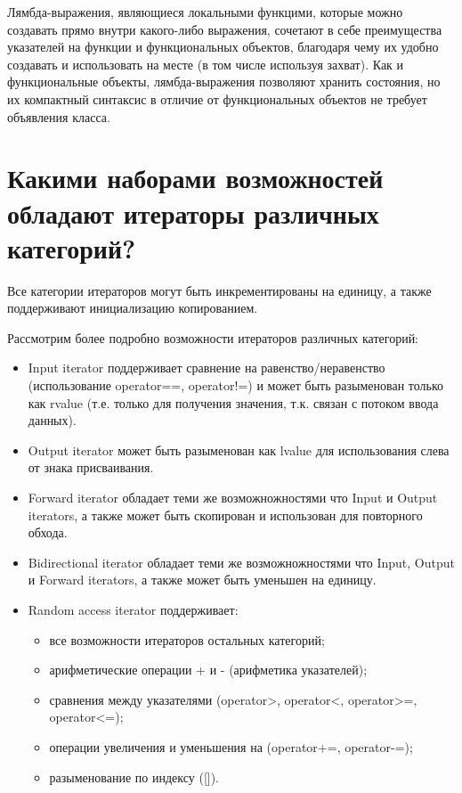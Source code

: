 \documentclass[a4paper,12pt]{article}	%
\begin{document}
	Лямбда-выражения, являющиеся локальными функцими, которые можно создавать прямо внутри какого-либо выражения, сочетают в себе преимущества указателей на функции и функциональных объектов, благодаря чему их удобно создавать и использовать на месте (в том числе используя захват). Как и функциональные объекты, лямбда-выражения позволяют хранить состояния, но их компактный синтаксис в отличие от функциональных объектов не требует объявления класса.
	
\section{Какими наборами возможностей обладают итераторы различных категорий?}

	Все категории итераторов могут быть инкрементированы на единицу, а также поддерживают инициализацию копированием.
	
	Рассмотрим более подробно возможности итераторов различных категорий:
	
	\begin{itemize}

		\item Input iterator поддерживает сравнение на равенство/неравенство (использование operator==, operator!=)	и может быть разыменован только как rvalue (т.е. только для получения значения, т.к. связан с потоком ввода данных).
		
		\item Output iterator может быть разыменован как lvalue для использования слева от знака присваивания.
		
		\item Forward iterator обладает теми же возможножностями что Input и Output iterators, а также может быть скопирован и использован для повторного обхода.
		
		\item Bidirectional iterator обладает теми же возможножностями что Input, Output и Forward iterators, а также может быть уменьшен на единицу.
		
		\item Random access iterator поддерживает:
		
		\begin{itemize}
		
			\item все возможности итераторов остальных категорий;
			
			\item арифметические операции + и - (арифметика указателей);
			
			\item сравнения между указателями (operator>, operator<, operator>=, operator<=);
			
			\item операции увеличения и уменьшения на (operator+=, operator-=);
			
			\item разыменование по индексу ([]).
		
		\end{itemize}	
	
	\end{itemize} 
	
\end{document}
